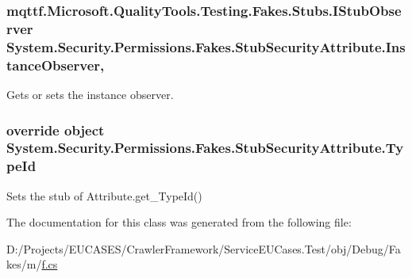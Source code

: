 \hypertarget{class_system_1_1_security_1_1_permissions_1_1_fakes_1_1_stub_security_attribute_ad05bc9896834bcecdb87a0cd4bc4d79b}{
\subsubsection[{Instance\-Observer}]{\setlength{\rightskip}{0pt plus 5cm}mqttf.\-Microsoft.\-Quality\-Tools.\-Testing.\-Fakes.\-Stubs.\-I\-Stub\-Observer System.\-Security.\-Permissions.\-Fakes.\-Stub\-Security\-Attribute.\-Instance\-Observer\hspace{0.3cm}{\ttfamily [get]}, {\ttfamily [set]}}}\label{class_system_1_1_security_1_1_permissions_1_1_fakes_1_1_stub_security_attribute_ad05bc9896834bcecdb87a0cd4bc4d79b}


Gets or sets the instance observer.

\hypertarget{class_system_1_1_security_1_1_permissions_1_1_fakes_1_1_stub_security_attribute_a8b420207775a37064ba8793b5277259a}{
\subsubsection[{Type\-Id}]{\setlength{\rightskip}{0pt plus 5cm}override object System.\-Security.\-Permissions.\-Fakes.\-Stub\-Security\-Attribute.\-Type\-Id\hspace{0.3cm}{\ttfamily [get]}}}\label{class_system_1_1_security_1_1_permissions_1_1_fakes_1_1_stub_security_attribute_a8b420207775a37064ba8793b5277259a}


Sets the stub of Attribute.\-get\-\_\-\-Type\-Id()



The documentation for this class was generated from the following file\-:\begin{DoxyCompactItemize}
\item 
D\-:/\-Projects/\-E\-U\-C\-A\-S\-E\-S/\-Crawler\-Framework/\-Service\-E\-U\-Cases.\-Test/obj/\-Debug/\-Fakes/m/\hyperlink{m_2f_8cs}{f.\-cs}\end{DoxyCompactItemize}
